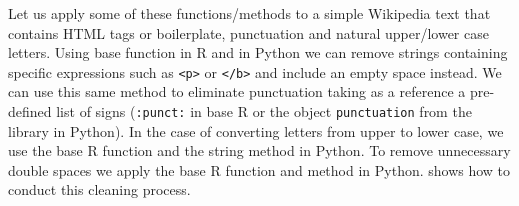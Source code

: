 Let us apply some of these functions/methods to a simple Wikipedia text that contains HTML tags or boilerplate, punctuation and natural upper/lower case letters. Using base function  in R and  in Python we can remove strings containing specific expressions such as \texttt{<p>} or \texttt{</b>} and include an empty space instead. We can use this same method to eliminate punctuation taking as a reference a pre-defined list of signs (\texttt{:punct:} in base R or the object \texttt{punctuation} from the library  in Python). In the case of converting letters from upper to lower case, we use the base R function  and the string method  in Python. To remove unnecessary double spaces we apply the base R function  and method  in Python.  shows how to conduct this cleaning process.

